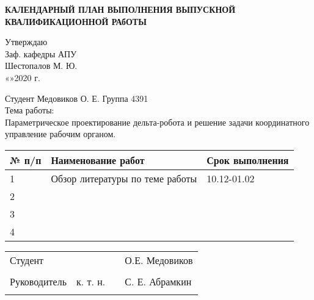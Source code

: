 \newpage
\begin{center}
\large{\textbf{КАЛЕНДАРНЫЙ ПЛАН ВЫПОЛНЕНИЯ ВЫПУСКНОЙ КВАЛИФИКАЦИОННОЙ РАбОТЫ}}\\
\end{center}
\begin{flushright}
Утверждаю\\
Заф. кафедры АПУ\\
\underline{\hspace{3cm}} Шестопалов М. Ю.\\
«\underline{\hspace{0.7cm}}»\underline{\hspace{3cm}}2020 г.
\end{flushright}

\hfill \break
Студент Медовиков О. Е. \hspace{7cm} Группа 4391\\
Тема работы:\\ Параметрическое проектирование дельта-робота и решение задачи координатного управление рабочим органом.\\

\hfill \break
\begin{tabular}{|p{20pt} |p{}| l|}
	\hline
	№ п/п & Наименование работ & Срок выполнения\\ \hline
	1 & Обзор литературы по теме работы & 10.12-01.02\\ \hline
	2 & &\\ \hline
	3 & &\\ \hline
	4 & &\\ \hline
\end{tabular}
\hfill \break
\hfill \break
\hfill \break
\hfill \break
\hfill \break
\hfill \break
\begin{tabular}{p{150pt} p{} ll}
Студент & & \underline{\hspace{3cm}} & О.Е. Медовиков\\\\
Руководитель & к. т. н. & \underline{\hspace{3cm}} &С. Е. Абрамкин\\\\
\end{tabular}
\thispagestyle{empty} %

